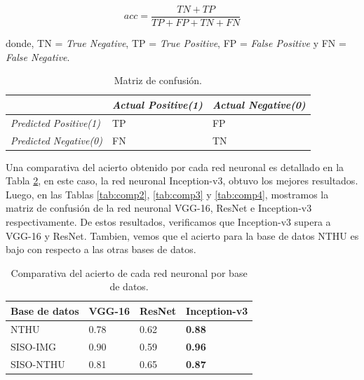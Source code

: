 \documentclass{article}
\begin{document}
	\begin{equation}\label{equ:acc}
		acc = \frac{TN + TP }{TP + FP + TN + FN}
	\end{equation}
	
	donde, TN = \textit{True Negative}, TP = \textit{True Positive}, FP = \textit{False Positive} y FN = \textit{False Negative}.
	
	\begin{table}[H]
		\centering		
		\caption{Matriz de confusión.}
		\label{tab:mat}
		\begin{tabular}{ p{4cm} p{3cm} p{3cm} }
			\hline 		
			& \textit{Actual Positive(1)} & \textit{Actual Negative(0)} \\
			\hline 
			\textit{Predicted Positive(1)} & TP & FP \\
			\textit{Predicted Negative(0)} & FN & TN \\
			\hline  
		\end{tabular}
	\end{table}
	

	Una comparativa del acierto obtenido por cada red neuronal es detallado en la Tabla \ref{tab:comp1}, en este caso, la red neuronal Inception-v3, obtuvo los mejores resultados. Luego, en las Tablas \ref{tab:comp2}, \ref{tab:comp3} y \ref{tab:comp4}, mostramos la matriz de confusión de la red neuronal VGG-16, ResNet e Inception-v3 respectivamente. De estos resultados, verificamos que Inception-v3 supera a VGG-16 y ResNet. Tambien, vemos que el acierto para la base de datos NTHU es bajo con respecto a las otras bases de datos.
	
	

	\begin{table}[H]
		\centering		
		\caption{Comparativa del acierto de cada red neuronal por base de datos.}
		\label{tab:comp1}
		\begin{tabular}{ p{3cm} p{3cm} p{3cm} p{3cm}}
			\hline 
			\textbf{Base de datos} & \textbf{VGG-16} & \textbf{ResNet} & \textbf{Inception-v3}   \\
			\hline 
			NTHU & 0.78 & 0.62 & \textbf{0.88} \\
			SISO-IMG & 0.90 & 0.59 & \textbf{0.96} \\			
			SISO-NTHU & 0.81 & 0.65 & \textbf{0.87} \\
			\hline 
		\end{tabular}
	\end{table}
\end{document}
